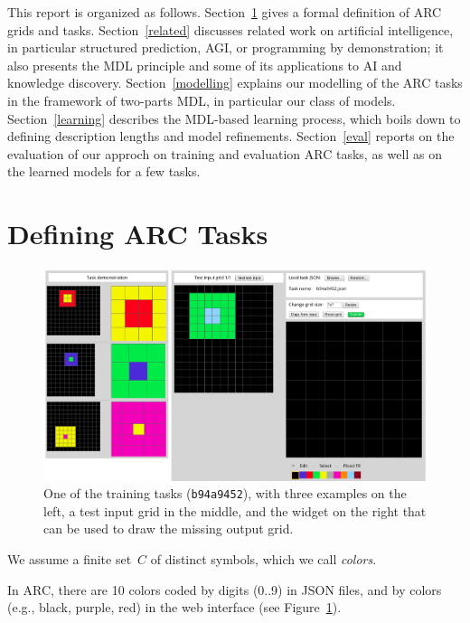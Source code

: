 \documentclass[a4paper]{llncs}
\begin{document}
This report is organized as follows. Section~\ref{arc} gives a formal
definition of ARC grids and tasks. Section~\ref{related} discusses
related work on artificial intelligence, in particular structured
prediction, AGI, or programming by demonstration; it also presents the
MDL principle and some of its applications to AI and knowledge
discovery. Section~\ref{modelling} explains our modelling of the ARC
tasks in the framework of two-parts MDL, in particular our class of
models. Section~\ref{learning} describes the MDL-based learning
process, which boils down to defining description lengths and model
refinements. Section~\ref{eval} reports on the evaluation of our
approch on training and evaluation ARC tasks, as well as on the
learned models for a few tasks.

\section{Defining ARC Tasks}
\label{arc}

\begin{figure}[t]
  \centering
  \includegraphics[width=\textwidth]{fig/training_b94a9452.png}
  \caption{One of the training tasks ({\tt b94a9452}), with three
    examples on the left, a test input grid in the middle, and the
    widget on the right that can be used to draw the missing output
    grid.}
  \label{fig:task}
\end{figure}

\begin{definition}[colors]
  We assume a finite set~$C$ of distinct symbols, which we call {\em colors}.
\end{definition}

In ARC, there are 10 colors coded by digits (0..9) in JSON files, and
by colors (e.g., black, purple, red) in the web interface (see
Figure~\ref{fig:task}).
\end{document}
